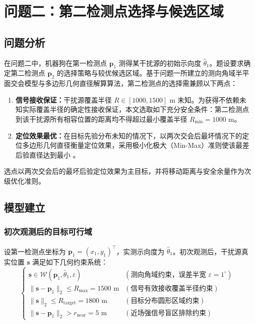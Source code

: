 \documentclass[zihao=-4,a4paper,UTF8]{ctexart}
\begin{document}
\section{问题二：第二检测点选择与候选区域}

\subsection{问题分析}

在问题二中，机器狗在第一检测点 $\mathbf{p}_1$ 测得某干扰源的初始示向度 $\hat\theta_1$。题设要求确定第二检测点 $\mathbf{p}_2$ 的选择策略与较优候选区域。基于问题一所建立的测向角域半平面交会模型与多边形几何直径解算算法，第二检测点的选择需兼顾以下两点：
\begin{enumerate}[leftmargin=2.5em, itemsep=0.2em]
    \item \textbf{信号接收保证：}干扰源覆盖半径 $R \in [1000, 1500]\text{ m}$ 未知。为获得不依赖未知实际覆盖半径的确定性接收保证，本文选取如下充分安全条件：第二检测点到该干扰源所有相容位置的距离均不得超过最小覆盖半径 $R_{\min} = 1000\text{ m}$。
    \item \textbf{定位效果最优：}在目标先验分布未知的情况下，以两次交会后最坏情况下的定位多边形几何直径衡量定位效果，采用极小化极大（Min-Max）准则使该最差后验直径达到最小 \cite{tokekar2013}。
\end{enumerate}

选点以两次交会后的最坏后验定位效果为主目标，并将移动距离与安全余量作为次级优化准则。

\subsection{模型建立}

\subsubsection{初次观测后的目标可行域}

设第一检测点坐标为 $\mathbf{p}_1 = (x_1, y_1)^\top$，实测示向度为 $\hat\theta_1$。初次观测后，干扰源真实位置 $\mathbf{s}$ 满足如下几何约束系统：
\begin{equation}
    \begin{cases}
        \mathbf{s} \in \mathcal{W}(\mathbf{p}_1, \hat\theta_1, \varepsilon) & (\text{测向角域约束，误差半宽 }\varepsilon = 1^\circ) \\
        \|\mathbf{s} - \mathbf{p}_1\|_2 \le R_{\max} = 1500\text{ m} & (\text{信号有效接收覆盖半径约束}) \\
        \|\mathbf{s}\|_2 \le R_{\text{target}} = 1800\text{ m} & (\text{目标分布圆形区域约束}) \\
        \|\mathbf{s} - \mathbf{p}_1\|_2 > r_{\text{near}} = 5\text{ m} & (\text{近场强信号盲区排除约束})
    \end{cases}
\end{equation}
\end{document}
